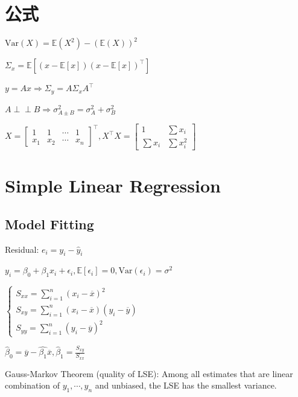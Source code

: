 \documentclass[9pt,landscape]{article}
\begin{document}
\begin{multicols}{3}

\columnseprule=0.25pt

\section{公式}

$\mathrm{Var}(X)=\mathbb{E}(X^2)-(\mathbb{E}(X))^2$

$\Sigma_x = \mathbb{E}\left[(x-\mathbb{E}[x])(x-\mathbb{E}[x])^\top\right]$

$y=Ax\Rightarrow \Sigma_y=A\Sigma_xA^\top$

$A\perp\!\!\!\!\perp B\Rightarrow \sigma^2_{A\pm B}=\sigma^2_A + \sigma_B^2$

$X = \begin{bmatrix}
1&1&\cdots&1\\
x_1&x_2&\cdots&x_n
\end{bmatrix}^\top, X^\top X = \begin{bmatrix}
1&\sum x_i\\
\sum x_i&\sum x_i^2
\end{bmatrix}$

\section{Simple Linear Regression}

\subsection{Model Fitting}

Residual: $e_i=y_i-\hat{y}_i$

$y_i=\beta_0+\beta_1x_i+\epsilon_i, \mathbb{E}[\epsilon_i]=0, \mathrm{Var}(\epsilon_i)=\sigma^2$

$
\begin{cases}
S_{xx}=\sum_{i=1}^n\left(x_i-\overline{x}\right)^2\\
S_{xy}=\sum_{i=1}^{n}\left(x_i-\overline{x}\right)\left(y_i-\overline{y}\right)\\
S_{yy}=\sum_{i=1}^{n}\left(y_i-\overline{y}\right)^2
\end{cases}
$

$
\hat{\beta}_0=\overline{y}-\hat{\beta_1}\overline{x}, \hat{\beta}_1=\frac{S_{xy}}{S_{xx}}
$

Gauss-Markov Theorem (quality of LSE): Among all estimates that are linear combination of $y_1 , \cdots, y_n$ and unbiased, the LSE has the smallest variance.


\end{multicols}
\end{document}
